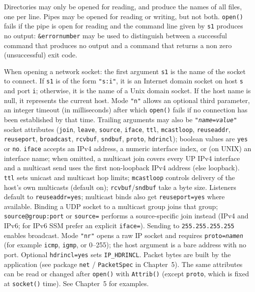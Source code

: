 Directories may only be opened for reading, and produce the names of all
files, one per line. Pipes may be opened for reading or writing, but
not both. \texttt{open()} fails if the pipe is open for reading and
the command line given by \texttt{s1} produces no output:
\texttt{\&errornumber} may be used to distinguish between a successful
command that produces no output and a command that returns a non zero
(unsuccessful) exit code.

When opening a network socket: the first argument \texttt{s1} is the
name of the socket to connect. If \texttt{s1} is of the form
\texttt{"s:i"}, it is an Internet domain socket on
host \texttt{s} and port \texttt{i}; otherwise, it is the name of a Unix
domain socket. If the host name is null, it represents the current
host. Mode \texttt{"n"} allows an optional third parameter,
an integer timeout (in milliseconds) after which \texttt{open()} fails
if no connection has been established by that time.
Trailing arguments may also be \texttt{"\textit{name}=\textit{value}"}
socket attributes (\texttt{join}, \texttt{leave}, \texttt{source},
\texttt{iface}, \texttt{ttl}, \texttt{mcastloop},
\texttt{reuseaddr}, \texttt{reuseport}, \texttt{broadcast},
\texttt{rcvbuf}, \texttt{sndbuf}, \texttt{proto}, \texttt{hdrincl});
boolean values are \texttt{yes} or \texttt{no}. \texttt{iface}
accepts an IPv4 address, a numeric interface index, or (on UNIX) an
interface name; when omitted, a multicast join covers every UP IPv4
interface and a multicast send uses the first non-loopback IPv4
address (else loopback). \texttt{ttl} sets unicast and multicast hop
limits; \texttt{mcastloop} controls delivery of the host's own
multicasts (default on); \texttt{rcvbuf}/\texttt{sndbuf} take a byte
size. Listeners default to \texttt{reuseaddr=yes}; multicast binds
also get \texttt{reuseport=yes} where available. Binding a UDP socket
to a multicast group joins that group; \texttt{source@group:port} or
\texttt{source=} performs a source-specific join instead (IPv4 and
IPv6; for IPv6 SSM prefer an explicit \texttt{iface=}). Sending to
\texttt{255.255.255.255} enables broadcast.
Mode \texttt{"nr"} opens a raw IP socket and requires
\texttt{proto=\textit{name{\textbar}n}} (for example \texttt{icmp},
\texttt{igmp}, or 0--255); the host argument is a bare address with
no port. Optional \texttt{hdrincl=yes} sets \texttt{IP\_HDRINCL}.
Packet bytes are built by the application (see package \texttt{net}
/ \texttt{PacketSpec} in Chapter~5). The same attributes can be read
or changed after \texttt{open()} with \texttt{Attrib()} (except
\texttt{proto}, which is fixed at \texttt{socket()} time). See
Chapter~5 for examples.

